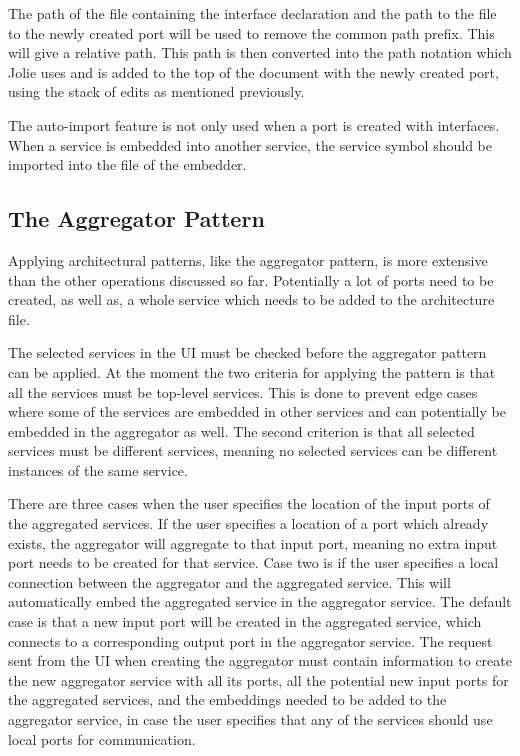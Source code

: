 The path of the file containing the interface declaration and the path to the file to the newly created port will be used to remove the common path prefix. This will give a relative path.
This path is then converted into the path notation which Jolie uses and is added to the top of the document with the newly created port, using the stack of edits as mentioned previously.

The auto-import feature is not only used when a port is created with interfaces. When a service is embedded into another service, the service symbol should be imported into the file of the embedder.

\subsection{The Aggregator Pattern}
Applying architectural patterns, like the aggregator pattern, is more extensive than the other operations discussed so far.
Potentially a lot of ports need to be created, as well as, a whole service which needs to be added to the architecture file.

The selected services in the UI must be checked before the aggregator pattern can be applied. At the moment the two criteria for applying the pattern is that all the services must be top-level services. This is done to 
prevent edge cases where some of the services are embedded in other services and can potentially be embedded in the aggregator as well. 
The second criterion is that all selected services must be different services, meaning no selected services can be different instances of the same service.

There are three cases when the user specifies the location of the input ports of the aggregated services.
If the user specifies a location of a port which already exists, the aggregator will aggregate to that input port, meaning no extra input port needs to be created for that service.
Case two is if the user specifies a local connection between the aggregator and the aggregated service. This will automatically embed the aggregated service in the aggregator service.
The default case is that a new input port will be created in the aggregated service, which connects to a corresponding output port in the aggregator service. 
The request sent from the UI when creating the aggregator must contain information to create the new aggregator service with all its ports, all the potential new input ports for the aggregated services, and the embeddings needed to be added to the aggregator service, in case the user specifies that any of the services should use local ports for communication.

